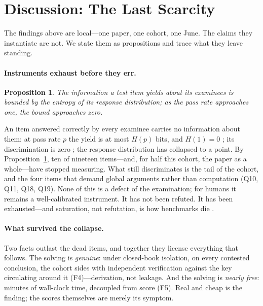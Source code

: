 \documentclass[11pt]{article}
\theoremstyle{plain}
\newtheorem{proposition}{Proposition}
\newcommand{\Q}[1]{Q#1}
\begin{document}
\section{Discussion: The Last Scarcity}
\label{sec:discussion}

The findings above are local---one paper, one cohort, one June. The
claims they instantiate are not. We state them as propositions and trace
what they leave standing.

\paragraph{Instruments exhaust before they err.}
\begin{proposition}\label{prop:exhaustion}
The information a test item yields about its examinees is bounded by the
entropy of its response distribution; as the pass rate approaches one,
the bound approaches zero.
\end{proposition}
An item answered correctly by every examinee carries no information
about them: at pass rate $p$ the yield is at most $H(p)$ bits, and
$H(1)=0$ \citep{shannon1948mathematical}; its discrimination is zero
\citep{lord1980applications}; the response distribution has collapsed
to a point. By Proposition~\ref{prop:exhaustion}, ten of nineteen
items---and, for half
this cohort, the paper as a whole---have stopped measuring. What still
discriminates is the tail of the cohort, and the four items that demand
global arguments rather than computation (\Q{10}, \Q{11}, \Q{18},
\Q{19}). None of
this is a defect of the examination; for humans it remains a
well-calibrated instrument. It has not been refuted. It has been
exhausted---and saturation, not refutation, is how benchmarks die
\citep{ott2022mapping,kiela2021dynabench}.

\paragraph{What survived the collapse.}
Two facts outlast the dead items, and together they license everything
that follows. The solving is \emph{genuine}: under closed-book isolation,
on every contested conclusion, the cohort sides with independent
verification against the key circulating around it (F4)---derivation, not
leakage. And the solving is \emph{nearly free}: minutes of wall-clock
time, decoupled from score (F5). Real and cheap is the finding; the
scores themselves are merely its symptom.
\end{document}
